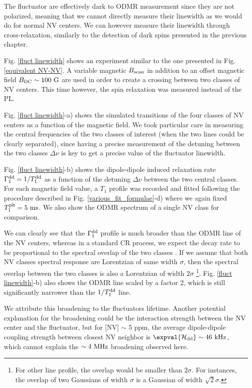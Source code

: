 \documentclass[a4paper, 11pt]{report}
\begin{document}
The fluctuator are effectively dark to ODMR measurement since they are not polarized, meaning that we cannot directly measure their linewidth as we would do for normal NV centers. We can however measure their linewidth through cross-relaxation, similarly to the detection of dark spins presented in the previous chapter.

Fig. \ref{fluct linewidth} shows an experiment similar to the one presented in Fig. \ref{equivalent NV-NV}. A variable magnetic $B_{\rm scan}$ in addition to an offset magnetic field $B_{\rm DC} \sim 100\ \rm G$ are used in order to create a crossing between two classes of NV centers. This time however, the spin relaxation was measured instead of the PL.

Fig. \ref{fluct linewidth}-a) shows the simulated transitions of the four classes of NV centers as a function of the magnetic field. We took particular care in measuring the central frequencies of the two classes of interest (when the two lines could be clearly separated), since having a precise measurement of the detuning between the two classes $\Delta \nu$ is key to get a precise value of the fluctuator linewidth.


Fig. \ref{fluct linewidth}-b) shows the dipole-dipole induced relaxation rate $\Gamma_1^{\rm dd}=1/T_1^{\rm dd}$ as a function of the detuning $\Delta \nu$ between the two central classes. For each magnetic field value, a $T_1$ profile was recorded and fitted following the procedure described in Fig. \ref{various_fit_formulae}-d) where we again fixed $T_1^{\rm ph}=5\ \rm ms$. We also show the ODMR spectrum of a single NV class for comparison.

We can clearly see that the $\Gamma_1^{\rm dd}$ profile is much broader than the ODMR line of the NV centers, whereas in a standard CR process, we expect the decay rate to be proportional to the spectral overlap of the two classes \citep{hall2016detection}. If we assume that both NV classes spectral response are Lorentzian of same width $\sigma$, then the spectral overlap between the two classes is also a Lorentzian of width $2 \sigma$ \footnote{For other line profile, the overlap would be smaller than $2 \sigma$. For instances, the overlap of two Gaussians of width $\sigma$ is a Gaussian of width $\sqrt{2} \sigma$.}. Fig. \ref{fluct linewidth}-b) also shows the ODMR line scaled by a factor $2$, which is still significantly narrower than the $1/T_1^{\rm dd}$ line.

We attribute this broadening to the fluctuators lifetime. Another potential explanation for the broadening could be the interaction strength between the NV center and the fluctuator, but for [NV] $\sim$ 5 ppm, the average dipole-dipole coupling strength between closest NV neighbor is $\expval{\mathcal{H}_{\rm dd}} \sim 46\ \rm kHz$, which cannot explain the $\sim 4\ \rm MHz$ broadening observed here.
\end{document}
